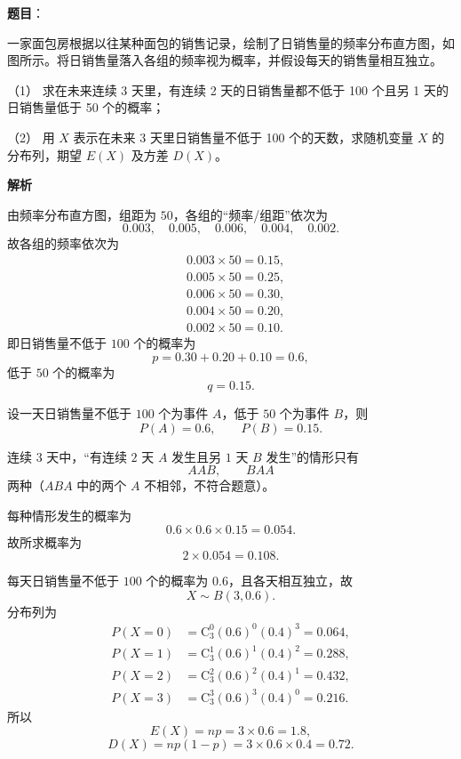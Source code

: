 \begin{answer}

\textbf{题目}：

一家面包房根据以往某种面包的销售记录，绘制了日销售量的频率分布直方图，如图所示。将日销售量落入各组的频率视为概率，并假设每天的销售量相互独立。
\nopagebreak[4]
\begin{center}\end{center}
\nopagebreak[4]
（1） 求在未来连续 3 天里，有连续 2 天的日销售量都不低于 100 个且另 1 天的日销售量低于 50 个的概率；

（2） 用 $X$ 表示在未来 3 天里日销售量不低于 100 个的天数，求随机变量 $X$ 的分布列，期望 $E(X)$ 及方差 $D(X)$。

\textbf{解析}

由频率分布直方图，组距为 $50$，各组的“频率/组距”依次为
\nopagebreak[4]
\[0.003,\quad0.005,\quad0.006,\quad0.004,\quad0.002.\]
故各组的频率依次为
\nopagebreak[4]
\[\begin{aligned}
&0.003\times50=0.15,\\
&0.005\times50=0.25,\\
&0.006\times50=0.30,\\
&0.004\times50=0.20,\\
&0.002\times50=0.10.
\end{aligned}\]
即日销售量不低于 $100$ 个的概率为
\nopagebreak[4]
\[p=0.30+0.20+0.10=0.6,\]
低于 $50$ 个的概率为
\nopagebreak[4]
\[q=0.15.\]


设一天日销售量不低于 $100$ 个为事件 $A$，低于 $50$ 个为事件 $B$，则
\nopagebreak[4]
\[P(A)=0.6,\qquad P(B)=0.15.\]

连续 $3$ 天中，“有连续 $2$ 天 $A$ 发生且另 $1$ 天 $B$ 发生”的情形只有
\nopagebreak[4]
\[AAB,\qquad BAA\]
两种（$ABA$ 中的两个 $A$ 不相邻，不符合题意）。

每种情形发生的概率为
\nopagebreak[4]
\[0.6\times0.6\times0.15=0.054.\]
故所求概率为
\nopagebreak[4]
\[2\times0.054=0.108.\]


每天日销售量不低于 $100$ 个的概率为 $0.6$，且各天相互独立，故
\nopagebreak[4]
\[X\sim B(3,0.6).\]
分布列为
\nopagebreak[4]
\[\begin{aligned}
P(X=0)&=\mathrm C_3^0(0.6)^0(0.4)^3=0.064,\\
P(X=1)&=\mathrm C_3^1(0.6)^1(0.4)^2=0.288,\\
P(X=2)&=\mathrm C_3^2(0.6)^2(0.4)^1=0.432,\\
P(X=3)&=\mathrm C_3^3(0.6)^3(0.4)^0=0.216.
\end{aligned}\]
所以
\nopagebreak[4]
\[E(X)=np=3\times0.6=1.8,\]
\nopagebreak[4]
\[D(X)=np(1-p)=3\times0.6\times0.4=0.72.\]


\end{answer}
